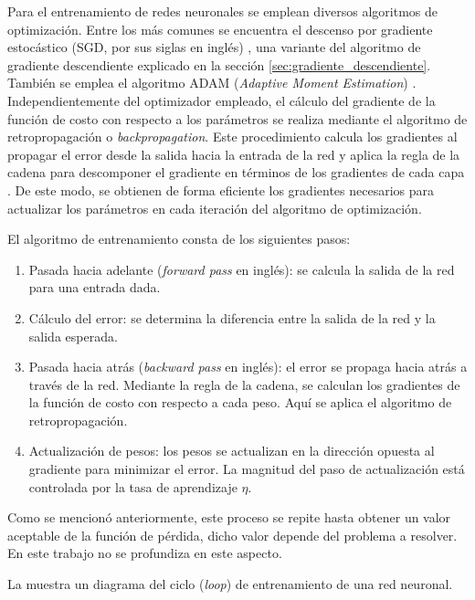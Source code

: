 Para el entrenamiento de redes neuronales se emplean diversos algoritmos de optimización. Entre los más comunes se encuentra el descenso por gradiente estocástico (SGD, por sus siglas en inglés) \cite{Qian1999}, una variante del algoritmo de gradiente descendiente explicado en la sección \ref{sec:gradiente_descendiente}. También se emplea el algoritmo ADAM (\textit{Adaptive Moment Estimation}) \cite{kingma2017adammethodstochasticoptimization}. Independientemente del optimizador empleado, el cálculo del gradiente de la función de costo con respecto a los parámetros se realiza mediante el algoritmo de retropropagación o \textit{backpropagation}. Este procedimiento calcula los gradientes al propagar el error desde la salida hacia la entrada de la red y aplica la regla de la cadena para descomponer el gradiente en términos de los gradientes de cada capa \cite{rumelhart1986learning}. De este modo, se obtienen de forma eficiente los gradientes necesarios para actualizar los parámetros en cada iteración del algoritmo de optimización.

El algoritmo de entrenamiento consta de los siguientes pasos:

\begin{enumerate}
    \item Pasada hacia adelante (\textit{forward pass} en inglés): se calcula la salida de la red para una entrada dada.
    \item Cálculo del error: se determina la diferencia entre la salida de la red y la salida esperada.
    \item Pasada hacia atrás (\textit{backward pass} en inglés): el error se propaga hacia atrás a través de la red. Mediante la regla de la cadena, se calculan los gradientes de la función de costo con respecto a cada peso. Aquí se aplica el algoritmo de retropropagación.
    \item Actualización de pesos: los pesos se actualizan en la dirección opuesta al gradiente para minimizar el error. La magnitud del paso de actualización está controlada por la tasa de aprendizaje $\eta$.
\end{enumerate}


Como se mencionó anteriormente, este proceso se repite hasta obtener un valor aceptable de la función de pérdida, dicho valor depende del problema a resolver. En este trabajo no se profundiza en este aspecto.

La  muestra un diagrama del ciclo (\textit{loop}) de entrenamiento de una red neuronal.

